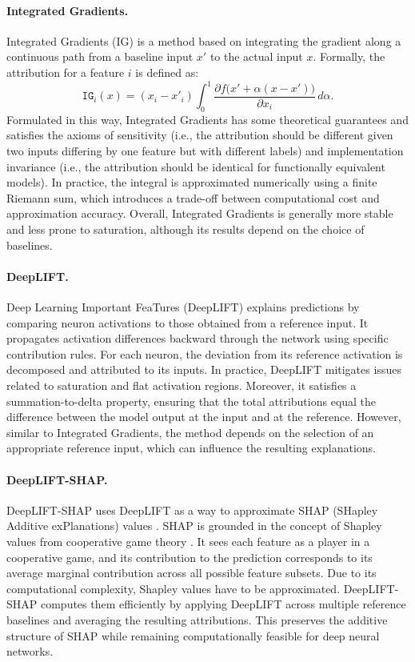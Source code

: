 \paragraph{Integrated Gradients.}
Integrated Gradients (IG) \cite{lig} is a method based on integrating the gradient along a continuous path from a baseline input $x'$ to the actual input $x$. Formally, the attribution for a feature $i$ is defined as:
\begin{equation}
    \texttt{IG}_i(x) = (x_i - x'_i) \int_{0}^{1} 
    \frac{\partial f\big(x' + \alpha (x - x')\big)}{\partial x_i} 
    \, d\alpha.
\end{equation}
Formulated in this way, Integrated Gradients has some theoretical guarantees and satisfies the axioms of sensitivity (i.e., the attribution should be different given two inputs differing by one feature but with different labels) and implementation invariance (i.e., the attribution should be identical for functionally equivalent models).
In practice, the integral is approximated numerically using a finite Riemann sum, which introduces a trade-off between computational cost and approximation accuracy. Overall, Integrated Gradients is generally more stable and less prone to saturation, although its results depend on the choice of baselines.

\paragraph{DeepLIFT.}
Deep Learning Important FeaTures (DeepLIFT) \cite{deeplift} explains predictions by comparing neuron activations to those obtained from a reference input. It propagates activation differences backward through the network using specific contribution rules. For each neuron, the deviation from its reference activation is decomposed and attributed to its inputs. In practice, DeepLIFT mitigates issues related to saturation and flat activation regions. Moreover, it satisfies a summation-to-delta property, ensuring that the total attributions equal the difference between the model output at the input and at the reference. However, similar to Integrated Gradients, the method depends on the selection of an appropriate reference input, which can influence the resulting explanations.

\paragraph{DeepLIFT-SHAP.}
DeepLIFT-SHAP \cite{deepliftshap} uses DeepLIFT as a way to approximate SHAP (SHapley Additive exPlanations) values \cite{deepliftshap,shap}. SHAP is grounded in the concept of Shapley values from cooperative game theory \cite{shapley_values}. It sees each feature as a player in a cooperative game, and its contribution to the prediction corresponds to its average marginal contribution across all possible feature subsets. Due to its computational complexity, Shapley values have to be approximated. DeepLIFT-SHAP computes them efficiently by applying DeepLIFT across multiple reference baselines and averaging the resulting attributions. This preserves the additive structure of SHAP while remaining computationally feasible for deep neural networks.


